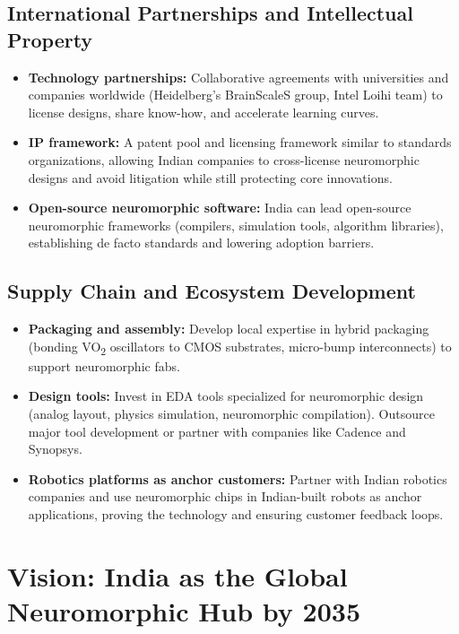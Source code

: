 \subsection{International Partnerships and Intellectual Property}

\begin{itemize}
\item \textbf{Technology partnerships:} Collaborative agreements with universities and companies worldwide (Heidelberg's BrainScaleS group, Intel Loihi team) to license designs, share know-how, and accelerate learning curves.

\item \textbf{IP framework:} A patent pool and licensing framework similar to standards organizations, allowing Indian companies to cross-license neuromorphic designs and avoid litigation while still protecting core innovations.

\item \textbf{Open-source neuromorphic software:} India can lead open-source neuromorphic frameworks (compilers, simulation tools, algorithm libraries), establishing de facto standards and lowering adoption barriers.
\end{itemize}

\subsection{Supply Chain and Ecosystem Development}

\begin{itemize}
\item \textbf{Packaging and assembly:} Develop local expertise in hybrid packaging (bonding VO\textsubscript{2} oscillators to CMOS substrates, micro-bump interconnects) to support neuromorphic fabs.

\item \textbf{Design tools:} Invest in EDA tools specialized for neuromorphic design (analog layout, physics simulation, neuromorphic compilation). Outsource major tool development or partner with companies like Cadence and Synopsys.

\item \textbf{Robotics platforms as anchor customers:} Partner with Indian robotics companies and use neuromorphic chips in Indian-built robots as anchor applications, proving the technology and ensuring customer feedback loops.
\end{itemize}

\section{Vision: India as the Global Neuromorphic Hub by 2035}

